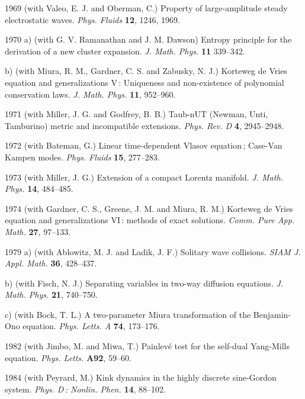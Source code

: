 \documentclass[11pt]{article}
\begin{document}
\item[1969]	(with Valeo, E. J. and Oberman, C.) Property of large-amplitude steady electrostatic waves. \textit{Phys. Fluids} 
\textbf{12}, 1246, 1969. 

\item[1970] a)	(with G. V. Ramanathan and J. M. Dawson) Entropy principle for the derivation of a new cluster expansion. 
\textit{J. Math. Phys.} \textbf{11} 339--342. 

b) (with Miura, R. M., Gardner, C. S. and Zabusky, N. J.) Korteweg de Vries equation and generalizations V\,: Uniqueness and 
non-existence of polynomial conservation laws. \textit{J. Math. Phys.} \textbf{11}, 952--960. 

\item[1971] (with Miller, J. G.	 and Godfrey, B. B.) Taub-nUT (Newman, Unti, Tamburino) metric and incompatible extensions. 
\textit{Phys. Rev. D} \textbf{4}, 2945--2948.

\item[1972]	(with Bateman, G.) Linear time-dependent Vlasov equation\,; Case-Van Kampen modes. \textit{Phys. Fluids} 
\textbf{15}, 277--283. 	

\item[1973]	(with Miller, J. G.) Extension of a compact Lorentz manifold. \textit{J. Math. Phys.} \textbf{14}, 484--485. 	

\item[1974] (with Gardner, C. S., Greene, J. M. and Miura, R. M.) Korteweg de Vries equation and generalizations 
VI\,: methods of exact solutions. \textit{Comm. Pure App. Math.} \textbf{27}, 97--133. 

\item[1979] a)	(with Ablowitz, M. J. and Ladik, J. F.) Solitary wave collisions. \textit{SIAM J. Appl. Math.} \textbf{36}, 
428--437. 

											b) (with Fisch, N. J.) Separating variables in two-way diffusion equations. \textit{J. Math. Phys.} 
											\textbf{21}, 740--750. 	

											c)	(with Bock, T. L.) A two-parameter Miura transformation of the Benjamin-Ono equation. 
											\textit{Phys. Letts. A} \textbf{74}, 173--176. 

\item[1982] (with Jimbo, M. and Miwa, T.) Painlev\'e test for the self-dual Yang-Mills equation. 
\textit{Phys. Letts.} \textbf{A92}, 59--60.

\item[1984] (with	Peyrard, M.) Kink dynamics in the highly discrete sine-Gordon system. \textit{Phys. D\,: Nonlin. Phen.} 
\textbf{14}, 88--102. 
\end{document}
